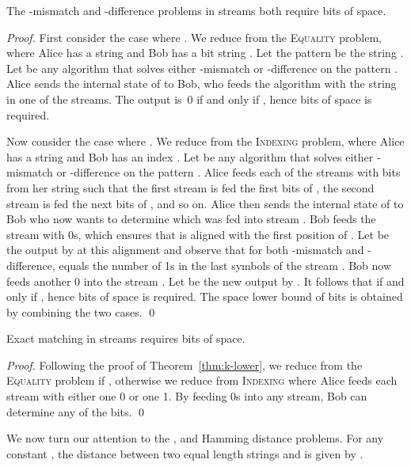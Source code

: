 \documentclass[envcountsame]{llncs}
\newcommand{\indexing}{\textsc{Indexing}\xspace}
\newcommand{\equality}{\textsc{Equality}\xspace}
\begin{document}
\begin{theorem}
    \label{thm:k-lower}
    The -mismatch and -difference problems in  streams both require  bits of space.
\end{theorem}
\begin{proof}
    First consider the case where . We reduce from the \equality problem, where Alice has a string  and Bob has a bit string .
    Let the pattern  be the string . Let  be any algorithm that solves either -mismatch or -difference on the pattern . Alice sends the internal state of  to Bob, who feeds the algorithm with the string  in one of the streams. The output is~0 if and only if , hence  bits of space is required.

    Now consider the case where . We reduce from the \indexing problem, where Alice has a string  and Bob has an index . Let  be any algorithm that solves either -mismatch or -difference on the pattern . Alice feeds each of the  streams with  bits from her string  such that the first stream is fed the first  bits of , the second stream is fed the next  bits of , and so on. Alice then sends the internal state of  to Bob who now wants to determine  which was fed into stream . Bob feeds the stream  with  0s, which ensures that  is aligned with the first position of . Let  be the output by  at this alignment and observe that for both -mismatch and -difference,  equals the number of 1s in the last  symbols of the stream . Bob now feeds another 0 into the stream . Let  be the new output by . It follows that  if and only if , hence  bits of space is required.    The space lower bound of  bits is obtained by combining the two cases.
    \qed
\end{proof}

\begin{theorem}
    Exact matching in  streams requires  bits of space.
\end{theorem}
\begin{proof}
    Following the proof of Theorem~\ref{thm:k-lower}, we reduce from the \equality problem if , otherwise we reduce from \indexing where Alice feeds each stream with either one 0 or one 1. By feeding  0s into any stream, Bob can determine any of the  bits.
    \qed
\end{proof}

We now turn our attention to the ,  and Hamming distance problems. For any constant , the  distance between two equal length strings  and  is given by .
\end{document}

